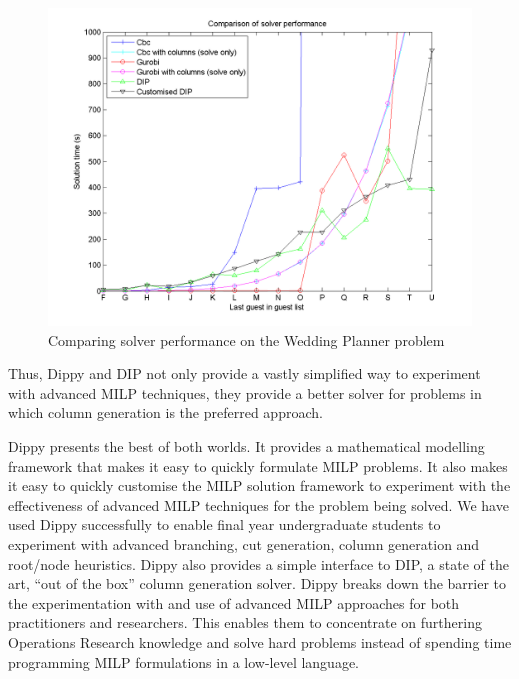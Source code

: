 \begin{figure}[htp]
\includegraphics[bb=0 0 1201 901,scale=0.335]{compare.png}
\caption{Comparing solver performance on the Wedding Planner problem} \label{fig:compare}
\end{figure}
Thus, Dippy and \ac{DIP} not only provide a vastly simplified way to experiment with advanced \ac{MILP} techniques, they provide a better solver for problems in which column generation is the preferred approach.

Dippy presents the best of both worlds. It provides a mathematical modelling framework that makes it easy to quickly formulate \ac{MILP} problems. It also makes it easy to quickly customise the \ac{MILP} solution framework to experiment with the effectiveness of advanced \ac{MILP} techniques for the problem being solved. We have used Dippy successfully to enable final year undergraduate students to experiment with advanced branching, cut generation, column generation and root/node heuristics. Dippy also provides a simple interface to \ac{DIP}, a state of the art, ``out of the box'' column generation solver. Dippy breaks down the barrier to the experimentation with and use of advanced \ac{MILP} approaches for both practitioners and researchers. This enables them to concentrate on furthering Operations Research knowledge and solve hard problems instead of spending time programming \ac{MILP} formulations in a low-level language.